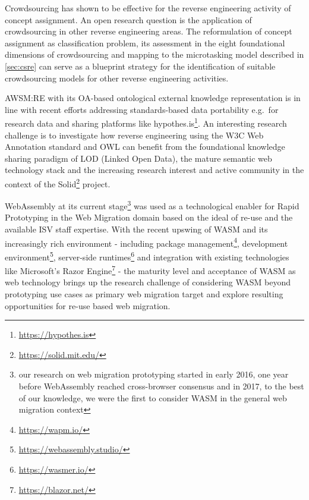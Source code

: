 Crowdsourcing has shown to be effective for the reverse engineering activity of concept assignment.
An open research question is the application of crowdsourcing in other reverse engineering areas.
The reformulation of concept assignment as classification problem, its assessment in the eight foundational dimensions of crowdsourcing \autocite{Latoza2016} and mapping to the microtasking model described in \cref{sec:csre} can serve as a blueprint strategy for the identification of suitable crowdsourcing models for other reverse engineering activities.

AWSM:RE with its OA-based ontological external knowledge representation is in line with recent efforts addressing standards-based data portability e.g.~for research data \autocite{Diaz2019OpenAnnotationInSLRs} and sharing platforms like hypothes.is\footnote{\url{https://hypothes.is}}.
An interesting research challenge is to investigate how reverse engineering using the W3C Web Annotation standard and OWL can benefit from the foundational knowledge sharing paradigm of LOD (Linked Open Data), the mature semantic web technology stack and the increasing research interest and active community in the context of the Solid\footnote{\url{https://solid.mit.edu/}} project.

WebAssembly at its current stage\footnote{our research on web migration prototyping started in early 2016, one year before WebAssembly reached cross-browser consensus and in 2017, to the best of our knowledge, we were the first to consider WASM in the general web migration context} was used as a technological enabler for Rapid Prototyping in the Web Migration domain based on the ideal of re-use and the available ISV staff expertise.
With the recent upswing of WASM and its increasingly rich environment - including package management\footnote{\url{https://wapm.io/}}, development environment\footnote{\url{https://webassembly.studio/}}, server-side runtimes\footnote{\url{https://wasmer.io/}} and integration with existing technologies like Microsoft's Razor Engine\footnote{\url{https://blazor.net/}} - the maturity level and acceptance of WASM as web technology brings up the research challenge of considering WASM beyond prototyping use cases as primary web migration target and explore resulting opportunities for re-use based web migration.

